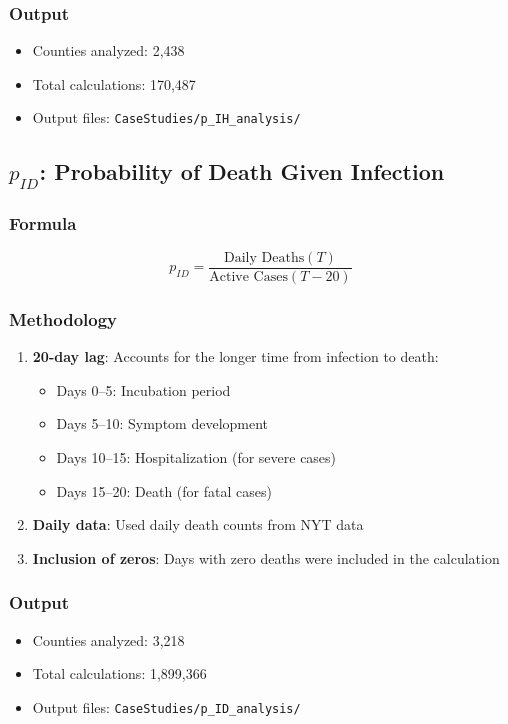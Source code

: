 \documentclass[11pt]{article}
\begin{document}
\subsubsection{Output}
\begin{itemize}
    \item Counties analyzed: 2,438
    \item Total calculations: 170,487
    \item Output files: \texttt{CaseStudies/p\_IH\_analysis/}
\end{itemize}

\subsection{$p_{ID}$: Probability of Death Given Infection}

\subsubsection{Formula}
\begin{equation}
    p_{ID} = \frac{\text{Daily Deaths}(T)}{\text{Active Cases}(T-20)}
\end{equation}

\subsubsection{Methodology}
\begin{enumerate}
    \item \textbf{20-day lag}: Accounts for the longer time from infection to death:
    \begin{itemize}
        \item Days 0--5: Incubation period
        \item Days 5--10: Symptom development
        \item Days 10--15: Hospitalization (for severe cases)
        \item Days 15--20: Death (for fatal cases)
    \end{itemize}
    \item \textbf{Daily data}: Used daily death counts from NYT data
    \item \textbf{Inclusion of zeros}: Days with zero deaths were included in the calculation
\end{enumerate}

\subsubsection{Output}
\begin{itemize}
    \item Counties analyzed: 3,218
    \item Total calculations: 1,899,366
    \item Output files: \texttt{CaseStudies/p\_ID\_analysis/}
\end{itemize}
\end{document}
